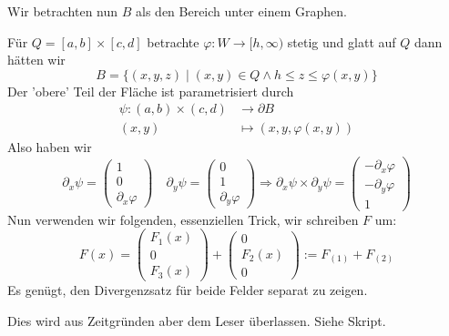 \documentclass[main.tex]{subfiles}
\begin{document}
\begin{Beweis}
  Wir betrachten nun $B$ als den Bereich unter einem Graphen.

  Für $Q = [a,b] \times [c,d]$ betrachte $\varphi: W \to [h, \infty)$ stetig und glatt auf $Q$ dann hätten wir
  $$B = \{(x,y,z) \mid (x,y) \in Q \land h \leq z \leq \varphi(x,y) \}$$
  Der 'obere' Teil der Fläche ist parametrisiert durch
  $$\begin{aligned}
    \psi: (a,b) \times (c,d) & \to \partial B \\
    (x,y) & \mapsto (x,y, \varphi(x,y))
  \end{aligned}$$
  Also haben wir
  $$\partial_x \psi = \begin{pmatrix}
    1 \\ 0 \\ \partial_x \varphi
  \end{pmatrix} \quad \partial_y \psi = \begin{pmatrix}
    0 \\ 1 \\ \partial_y \varphi
  \end{pmatrix} \Rightarrow \partial_x \psi \times \partial_y \psi = \begin{pmatrix}
    - \partial_x \varphi \\ - \partial_y \varphi \\ 1
  \end{pmatrix}$$
  Nun verwenden wir folgenden, essenziellen Trick, wir schreiben $F$ um:
  $$F(x) = \begin{pmatrix}
    F_1(x) \\ 0 \\ F_3(x)
  \end{pmatrix} + \begin{pmatrix}
    0 \\ F_2(x) \\ 0
  \end{pmatrix} := F_{(1)} + F_{(2)}$$
  Es genügt, den Divergenzsatz für beide Felder separat zu zeigen.

  Dies wird aus Zeitgründen aber dem Leser überlassen. Siehe Skript.
\end{Beweis}
\end{document}
